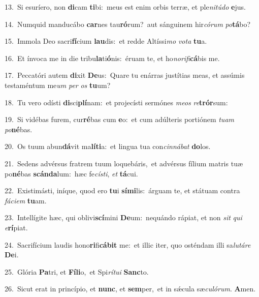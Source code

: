 {\numbfont\textcolor{\numbcolor}{13.}}~Si esuríero, non \textbf{di}\-cam \textbf{ti}\-bi:~\star meus est enim orbis terræ, et ple\-\textit{ni}\-\textit{tú}\textit{do} \textbf{e}\-jus.\par
{\numbfont\textcolor{\numbcolor}{14.}}~Numquid manducábo \textbf{car}\-nes tau\-\textbf{ró}\-rum?~\star aut sánguinem hir\-\textit{có}\-\textit{rum} \textit{po}\-\textbf{tá}bo?\par
{\numbfont\textcolor{\numbcolor}{15.}}~Immola Deo sacri\-\textbf{fí}\-cium \textbf{lau}\-dis:~\star et redde Altíssi\textit{mo} \textit{vo}\-\textit{ta} \textbf{tu}\-a.\par
{\numbfont\textcolor{\numbcolor}{16.}}~Et ínvoca me in die tribu\-\textbf{la}\-ti\-\textbf{ó}\-nis:~\star éruam te, et ho\-\textit{no}\-\textit{ri}\textit{fi}\textbf{cá}bis me.\par
{\numbfont\textcolor{\numbcolor}{17.}}~Peccatóri autem \textbf{di}\-xit \textbf{De}\-us:~\star Quare tu enárras justítias meas, et assúmis testaméntum me\textit{um} \textit{per} \textit{os} \textbf{tu}\-um?\par
{\numbfont\textcolor{\numbcolor}{18.}}~Tu vero odísti \textbf{di}\-sci\-\textbf{plí}\-nam:~\star et projecísti sermónes \textit{me}\-\textit{os} \textit{re}\-\textbf{trór}sum:\par
{\numbfont\textcolor{\numbcolor}{19.}}~Si vidébas furem, cur\-\textbf{ré}\-bas cum \textbf{e}\-o:~\star et cum adúlteris portiónem \textit{tu}\-\textit{am} \textit{po}\-\textbf{né}bas.\par
{\numbfont\textcolor{\numbcolor}{20.}}~Os tuum abun\-\textbf{dá}\-vit ma\-\textbf{lí}\-\textbf{ti}a:~\star et lingua tua con\-\textit{cin}\-\textit{ná}\textit{bat} \textbf{do}\-los.\par
{\numbfont\textcolor{\numbcolor}{21.}}~Sedens advérsus fratrem tuum loquebáris,~\dagger et advérsus fílium matris tuæ po\-\textbf{né}\-bas \textbf{scán}\-\textbf{da}lum:~\star hæc fe\-\textit{cís}\-\textit{ti}, \textit{et} \textbf{tá}\-cui.\par
{\numbfont\textcolor{\numbcolor}{22.}}~Existimásti, iníque, quod ero \textbf{tu}\-i \textbf{sí}\-\textbf{mi}lis:~\star árguam te, et státuam contra \textit{fá}\-\textit{ci}\textit{em} \textbf{tu}\-am.\par
{\numbfont\textcolor{\numbcolor}{23.}}~Intellígite hæc, qui oblivi\-\textbf{scí}\-mini \textbf{De}\-um:~\star nequándo rápiat, et non \textit{sit} \textit{qui} \textit{e}\-\textbf{rí}piat.\par
{\numbfont\textcolor{\numbcolor}{24.}}~Sacrifícium laudis hono\-\textbf{ri}\-fi\-\textbf{cá}\-\textbf{bit} me:~\star et illic iter, quo osténdam illi sa\-\textit{lu}\-\textit{tá}\textit{re} \textbf{De}\-i.\par
{\numbfont\textcolor{\numbcolor}{25.}}~Glória \textbf{Pa}\-tri, et \textbf{Fí}\-\textbf{li}o,~\star et Spi\-\textit{rí}\-\textit{tu}\textit{i} \textbf{Sanc}\-to.\par
{\numbfont\textcolor{\numbcolor}{26.}}~Sicut erat in princípio, et \textbf{nunc}\-, et \textbf{sem}\-per,~\star et in sǽcula sæ\-\textit{cu}\-\textit{ló}\textit{rum}. \textbf{A}\-men.\par
